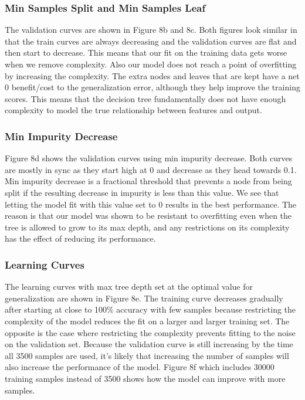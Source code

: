 \documentclass{article}
\begin{document}
\subsubsection*{Min Samples Split and Min Samples Leaf}
The validation curves are shown in Figure 8b and 8c. Both figures look similar in that the train curves are always decreasing and the validation curves are flat and then start to decrease. This means that our fit on the training data gets worse when we remove complexity. Also our model does not reach a point of overfitting by increasing the complexity. The extra nodes and leaves that are kept have a net 0 benefit/cost to the generalization error, although they help improve the training scores. This means that the decision tree fundamentally does not have enough complexity to model the true relationship between features and output. 

\subsubsection*{Min Impurity Decrease}
Figure 8d shows the validation curves using min impurity decrease. Both curves are mostly in sync as they start high at 0 and decrease as they head towards 0.1. Min impurity decrease is a fractional threshold that prevents a node from being split if the resulting decrease in impurity is less than this value. We see that letting the model fit with this value set to 0 results in the best performance. The reason is that our model was shown to be resistant to overfitting even when the tree is allowed to grow to its max depth, and any restrictions on its complexity has the effect of reducing its performance. 

\subsubsection*{Learning Curves}
The learning curves with max tree depth set at the optimal value for generalization are shown in Figure 8e. The training curve decreases gradually after starting at close to 100\% accuracy with few samples because restricting the complexity of the model reduces the fit on a larger and larger training set. The opposite is the case where restricting the complexity prevents fitting to the noise on the validation set. Because the validation curve is still increasing by the time all 3500 samples are used, it's likely that increasing the number of samples will also increase the performance of the model. Figure 8f which includes 30000 training samples instead of 3500 shows how the model can improve with more samples.
\end{document}
